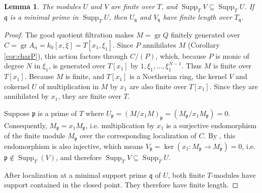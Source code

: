 \documentclass[11pt]{amsart}
\numberwithin{equation}{section}
\newtheorem{lemma}[theorem]{Lemma}
\theoremstyle{plain}
\theoremstyle{remark}
\begin{document}
\begin{lemma}\label{lem:tangential-finiteness}
The modules $U$ and $V$ are finite over $T$, and
$\operatorname{Supp}_T V\subseteq\operatorname{Supp}_T U$.
If $\mathfrak q$ is a minimal prime in $\operatorname{Supp}_T U$, then
$U_{\mathfrak q}$ and $V_{\mathfrak q}$ have finite length over
$T_{\mathfrak q}$.
\end{lemma}
\begin{proof}
The good quotient filtration makes $M = \operatorname{gr} Q$ finitely generated over $C = \operatorname{gr} A_n = k_0[x,\xi] = T[{x_1}, \xi_1]$.
Since $P$ annihilates $M$ (Corollary \ref{cor:charP}), this action factors
through $C/(P)$, which, because $P$ is monic of degree $N$ in $\xi_1$, is generated over $T[{x_1}]$ by
$1,\xi_1,\ldots,\xi_1^{N-1}$. Thus $M$ is finite over $T[{x_1}]$.
Because $M$ is finite, and $T[{x_1}]$ is a Noetherian ring, the kernel $V$ and cokernel $U$ of multiplication in $M$ by ${x_1}$ are also finite over $T[{x_1}]$. Since they are annihilated by ${x_1}$, they are finite over $T$. %

Suppose ${\mathfrak p}$ is a prime of $T$ where $U_{\mathfrak p} = (M/{x_1}M)_{\mathfrak p} =(M_{\mathfrak p}/{x_1}M_{\mathfrak p}) = 0$. Consequently, $M_{\mathfrak p} = {x_1}M_{\mathfrak p}$, i.e. multiplication by ${x_1}$ is a
surjective endomorphism of the finite module $M_{\mathfrak p}$ over the corresponding
localization of $C$. By , this endomorphism is also
injective, which means $V_{\mathfrak p} = \ker({x_1}:M_{\mathfrak p}\rightarrow M_{\mathfrak p}) = 0$, i.e. ${\mathfrak p} \notin \operatorname{Supp}_T(V)$, and therefore $\operatorname{Supp}_T V\subseteq\operatorname{Supp}_T U$.

After localization at a minimal support prime $\mathfrak q$ of $U$, both finite
$T$-modules have support contained in the closed point. They therefore have
finite length.
\end{proof}
\end{document}

